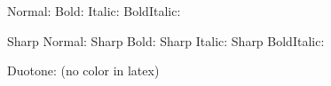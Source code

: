 \documentclass{article}
\begin{document}
\begin{texshade}
\newline
{}\newline

Normal: \newline
Bold: \textbf{}\newline
Italic: \textit{}\newline
BoldItalic: \textbf{\textit{}}

Sharp Normal: \newline
Sharp Bold: \textbf{}\newline
Sharp Italic: \textit{}\newline
Sharp BoldItalic: \textbf{\textit{}}

Duotone:  (no color in latex)
\end{texshade}
\end{document}
